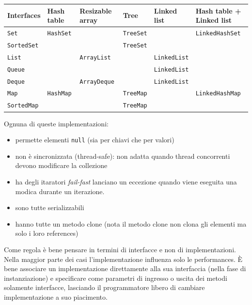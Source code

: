 \documentclass{article}
\begin{document}
\begin{tabular}{ | l | l | l | l | l | l |}
\hline
  Interfaces & Hash table  & Resizable array  & Tree  & Linked list  & Hash table + Linked list  \\
  \hline
  \texttt{Set} & \texttt{HashSet} &  & \texttt{TreeSet} && \texttt{LinkedHashSet} \\
  \hline
    \texttt{SortedSet} & &  & \texttt{TreeSet} &&  \\
  \hline
  \texttt{List} &  & \texttt{ArrayList}  & & \texttt{LinkedList} & \\
\hline  
  \texttt{Queue} &  & & & \texttt{LinkedList} &  \\
\hline  
  \texttt{Deque} &  & \texttt{ArrayDeque} & & \texttt{LinkedList} & \\
\hline  
  \texttt{Map} & \texttt{HashMap} & & \texttt{TreeMap} && \texttt{LinkedHashMap} \\
  \hline
    \texttt{SortedMap} & & & \texttt{TreeMap} &&  \\
\hline    
\end{tabular} 

Ognuna di queste implementazioni:
\begin{itemize}
\item permette elementi \texttt{null} (sia per chiavi che per valori)
\item non \`e sincronizzata (thread-safe): non adatta quando thread concorrenti devono modificare la collezione
\item ha degli itaratori \emph{fail-fast} lanciano un eccezione quando viene eseguita una modica durante un iterazione. 
\item sono tutte serializzabili
\item hanno tutte un metodo clone (nota il metodo clone non clona gli elementi ma solo i loro references)
\end{itemize}

\begin{framed}
Come regola \`e bene pensare in termini di interfacce e non di implementazioni. Nella maggior parte dei casi l'implementazione influenza solo le performances. \`E bene associare un implementazione direttamente alla sua interfaccia (nella fase di instanziazione) e specificare come parametri di ingresso o uscita dei metodi solamente interfacce, lasciando il programmatore libero di cambiare implementazione a suo piacimento. 
\end{framed}
\end{document}
